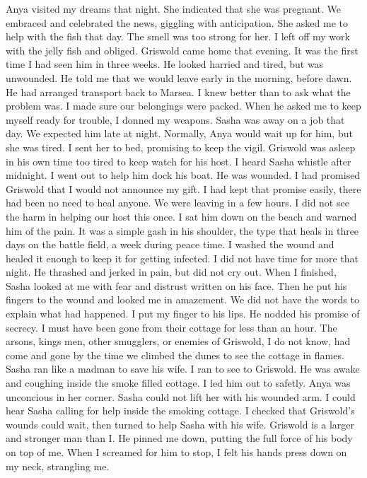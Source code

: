 \documentclass{article}
\begin{document}
Anya visited my dreams that night. She indicated that she was pregnant. We embraced and celebrated the news, giggling with anticipation. She asked me to help with the fish that day. The smell was too strong for her. I left off my work with the jelly fish and obliged. Griswold came home that evening. It was the first time I had seen him in three weeks. He looked harried and tired, but was unwounded. He told me that we would leave early in the morning, before dawn. He had arranged transport back to Marsea. I knew better than to ask what the problem was. I made sure our belongings were packed. When he asked me to keep myself ready for trouble, I donned my weapons. Sasha was away on a job that day. We expected him late at night. Normally, Anya would wait up for him, but she was tired. I sent her to bed, promising to keep the vigil. Griswold was asleep in his own time too tired to keep watch for his host. I heard Sasha whistle after midnight. I went out to help him dock his boat. He was wounded. I had promised Griswold that I would not announce my gift. I had kept that promise easily, there had been no need to heal anyone. We were leaving in a few hours. I did not see the harm in helping our host this once. I sat him down on the beach and warned him of the pain. It was a simple gash in his shoulder, the type that heals in three days on the battle field, a week during peace time. I washed the wound and healed it enough to keep it for getting infected. I did not have time for more that night. He thrashed and jerked in pain, but did not cry out. When I finished, Sasha looked at me with fear and distrust written on his face. Then he put his fingers to the wound and looked me in amazement. We did not have the words to explain what had happened. I put my finger to his lips. He nodded his promise of secrecy. I must have been gone from their cottage for less than an hour. The arsons, kings men, other smugglers, or enemies of Griswold, I do not know, had come and gone by the time we climbed the dunes to see the cottage in flames. Sasha ran like a madman to save his wife. I ran to see to Griswold. He was awake and coughing inside the smoke filled cottage. I led him out to safetly. Anya was unconcious in her corner. Sasha could not lift her with his wounded arm. I could hear Sasha calling for help inside the smoking cottage. I checked that Griswold's wounds could wait, then turned to help Sasha with his wife. Griswold is a larger and stronger man than I. He pinned me down, putting the full force of his body on top of me. When I screamed for him to stop, I felt his hands press down on my neck, strangling me. 
\end{document}
